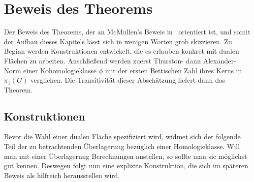 \section{Beweis des Theorems}
\label{sec:proofs}
Der Beweis des Theorems, der an McMullen's Beweis in~\cite{MCMULLEN.2002} orientiert ist, und somit der Aufbau dieses Kapitels lässt sich in wenigen Worten grob skizzieren. Zu Beginn werden Konstruktionen entwickelt, die es erlauben konkret mit dualen Flächen zu arbeiten. Anschließend werden zuerst Thurston- dann Alexander-Norm einer Kohomologieklasse $\phi$ mit der ersten Bettischen Zahl ihres Kerns in $\pi_1(G)$ verglichen. Die Transitivität dieser Abschätzung liefert dann das Theorem. 

\subsection{Konstruktionen}
\label{sec:constr}
Bevor die Wahl einer dualen Fläche spezifiziert wird, widmet sich der folgende Teil der zu betrachtenden Überlagerung bezüglich einer Homologieklasse. Will man mit einer Überlagerung Berechnungen anstellen, so sollte man sie möglichst gut kennen. Deswegen folgt nun eine explizite Konstruktion, die sich im späteren Beweis als hilfreich herausstellen wird.

